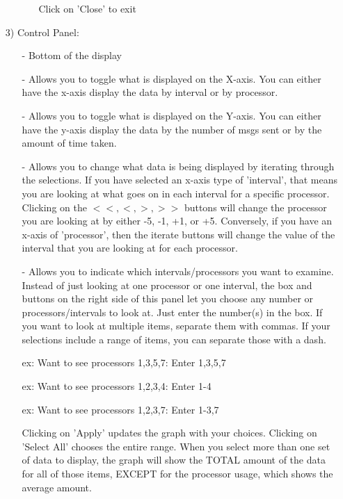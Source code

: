 \documentclass[10pt,dvips]{article}
\begin{document}
\begin{enumerate}
\begin{itemize}
\begin{itemize}
      Click on 'Close' to exit
      \end{itemize}
   \end{itemize}
\item[3)]
Control Panel:
   \begin{itemize}
   \item[-]
   Bottom of the display
   \item[-]
   Allows you to toggle what is displayed on the X-axis.  You can either
   have the x-axis display the data by interval or by processor.
   \item[-]
   Allows you to toggle what is displayed on the Y-axis.  You can
   either have the y-axis display the data by the number of msgs sent
   or by the amount of time taken.
   \item[-]
   Allows you to change what data is being displayed by iterating
   through the selections.  If you have selected an x-axis type of
   'interval', that means you are looking at what goes on in each
   interval for a specific processor.  Clicking on the $<<, <, >, >>$
   buttons will change the processor you are looking at by either -5,
   -1, +1, or +5.  Conversely, if you have an x-axis of 'processor',
   then the iterate buttons will change the value of the interval that
   you are looking at for each processor.
   \item[-]
   Allows you to indicate which intervals/processors you want to
   examine.  Instead of just looking at one processor or one interval,
   the box and buttons on the right side of this panel let you choose
   any number or processors/intervals to look at.  Just enter the
   number(s) in the box.  If you want to look at multiple items,
   separate them with commas.  If your selections include a range of
   items, you can separate those with a dash.

   ex: Want to see processors 1,3,5,7:  Enter 1,3,5,7

   ex: Want to see processors 1,2,3,4:  Enter 1-4

   ex: Want to see processors 1,2,3,7:  Enter 1-3,7

   Clicking on 'Apply' updates the graph with your choices. Clicking
   on 'Select All' chooses the entire range.  When you select more
   than one set of data to display, the graph will show the TOTAL
   amount of the data for all of those items, EXCEPT for the processor
   usage, which shows the average amount.
   \end{itemize}
\end{enumerate}
\end{document}
